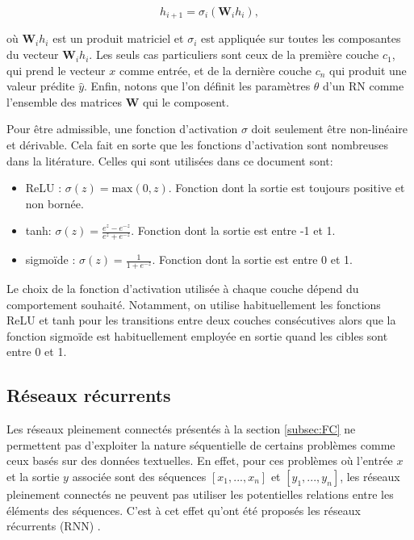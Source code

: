 \begin{equation*}
    h_{i+1} = \sigma_i \left( \mathbf{W}_i h_i\right),
\end{equation*}

où $\mathbf{W}_i h_i$ est un produit matriciel et $\sigma_i$ 
est appliquée sur toutes les composantes du vecteur $\mathbf{W}_i h_i$.
Les seuls cas particuliers sont ceux de la première couche $c_1$, qui
prend le vecteur $x$ comme entrée, et de la dernière couche $c_n$ qui 
produit une valeur prédite $\hat{y}$.
Enfin, notons que l'on définit les paramètres $\theta$ d'un RN comme 
l'ensemble des matrices $\mathbf{W}$ qui le composent.

Pour être admissible, une fonction d'activation $\sigma$ doit seulement 
être non-linéaire et dérivable.
Cela fait en sorte que les fonctions d'activation sont nombreuses 
dans la litérature.
Celles qui sont utilisées dans ce document sont:
\begin{itemize}
    \item ReLU \citep{xu2015empirical}: $\sigma(z) = \text{max}(0, z)$. Fonction dont la sortie 
    est toujours positive et non bornée.
    \item tanh: $\sigma(z) = \frac{e^z - e^{-z}}{e^z + e^{-z}}$. Fonction dont la 
    sortie est entre -1 et 1.
    \item sigmoïde : $\sigma(z) = \frac{1}{1 + e^{-z}}$. Fonction dont la sortie est entre 
    0 et 1.
\end{itemize}

Le choix de la fonction d'activation utilisée à chaque couche dépend 
du comportement souhaité. 
Notamment, on utilise habituellement les fonctions ReLU et tanh pour les
transitions entre deux couches consécutives alors que la fonction sigmoïde 
est habituellement employée en sortie quand les cibles sont entre 0 et 1.

\subsection{Réseaux récurrents}
\label{subsec:RNN}

Les réseaux pleinement connectés présentés à la section \ref{subsec:FC}
ne permettent pas d'exploiter la nature séquentielle de certains problèmes
comme ceux basés sur des données textuelles.
En effet, pour ces problèmes où l'entrée $x$ et la sortie $y$ associée sont 
des séquences $[x_1, ..., x_n]$ et $[y_1, ..., y_n]$, les réseaux 
pleinement connectés ne peuvent pas utiliser les potentielles 
relations entre les éléments des séquences.
C'est à cet effet qu'ont été proposés les réseaux récurrents (RNN)
\citep{schuster1997bidirectional}.


